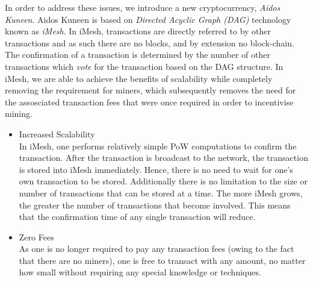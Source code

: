 \documentclass[a4paper,10pt,twocolumn]{article}
\begin{document}
In order to address these issues, we introduce a new cryptocurrency, \emph{Aidos Kuneen}.
Aidos Kuneen is based on \emph{Directed Acyclic Graph (DAG)} technology known as \emph{iMesh}.
In iMesh, transactions are directly referred to by other transactions and as such there are no blocks, and by extension no block-chain.
The confirmation of a transaction is determined by the number of other transactions which \emph{vote} for the transaction based on the
DAG structure. In iMesh, we are able to achieve the benefits of scalability while completely removing the requirement for miners, which subsequently removes the need for the assosciated transaction fees that were once required in order to incentivise mining.
\vspace{-0.5\baselineskip}
\begin{itemize}
	\setlength\itemsep{0em}
	\item{Increased Scalability}\mbox{}\\ 
In iMesh, one performs relatively simple PoW computations to confirm the transaction. After the transaction is broadcast to the network,
the transaction is stored into iMesh immediately. Hence, there is no need to wait for one's own transaction to be stored. Additionally 
there is no limitation to the size or number of transactions that can be stored at a time. The more iMesh grows, the greater the number 
of transactions that become involved. This means that the confirmation time of any single transaction will reduce.

\item{Zero Fees}\mbox{}\\ 
As one is no longer required to pay any transaction fees (owing to the fact that there are no miners), one is free to 
transact with any amount, no matter how small without requiring any special knowledge or techniques.


\end{itemize}
\end{document}
